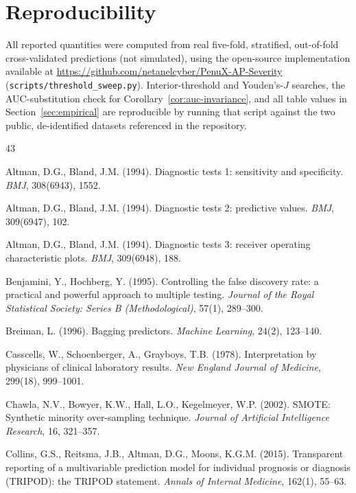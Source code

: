 \documentclass[11pt]{article}
\begin{document}
\section{Reproducibility}

All reported quantities were computed from real five-fold, stratified,
out-of-fold cross-validated predictions (not simulated), using the
open-source implementation available at
\url{https://github.com/netanelcyber/PenuX-AP-Severity}
(\texttt{scripts/threshold\_sweep.py}). Interior-threshold and Youden's-$J$
searches, the AUC-substitution check for
Corollary~\ref{cor:auc-invariance}, and all table values in
Section~\ref{sec:empirical} are reproducible by running that script against
the two public, de-identified datasets referenced in the repository.


\begin{thebibliography}{43}

Altman, D.G., Bland, J.M. (1994).
Diagnostic tests 1: sensitivity and specificity.
\textit{BMJ}, 308(6943), 1552.

Altman, D.G., Bland, J.M. (1994).
Diagnostic tests 2: predictive values.
\textit{BMJ}, 309(6947), 102.

Altman, D.G., Bland, J.M. (1994).
Diagnostic tests 3: receiver operating characteristic plots.
\textit{BMJ}, 309(6948), 188.

Benjamini, Y., Hochberg, Y. (1995).
Controlling the false discovery rate: a practical and powerful approach to
multiple testing.
\textit{Journal of the Royal Statistical Society: Series B (Methodological)},
57(1), 289--300.

Breiman, L. (1996).
Bagging predictors.
\textit{Machine Learning}, 24(2), 123--140.

Casscells, W., Schoenberger, A., Grayboys, T.B. (1978).
Interpretation by physicians of clinical laboratory results.
\textit{New England Journal of Medicine}, 299(18), 999--1001.

Chawla, N.V., Bowyer, K.W., Hall, L.O., Kegelmeyer, W.P. (2002).
SMOTE: Synthetic minority over-sampling technique.
\textit{Journal of Artificial Intelligence Research}, 16, 321--357.

Collins, G.S., Reitsma, J.B., Altman, D.G., Moons, K.G.M. (2015).
Transparent reporting of a multivariable prediction model for individual
prognosis or diagnosis (TRIPOD): the TRIPOD statement.
\textit{Annals of Internal Medicine}, 162(1), 55--63.


\end{thebibliography}
\end{document}
